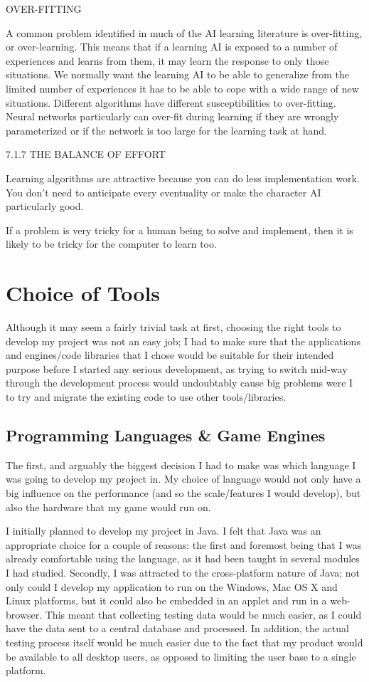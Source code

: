 \documentclass[a4paper,oneside]{report}
\begin{document}
OVER-FITTING

A common problem identified in much of the AI learning literature is over-fitting, or over-learning. This means that if a learning AI is exposed to a number of experiences and learns from them, it may learn the response to only those situations. We normally want the learning AI to be able to generalize from the limited number of experiences it has to be able to cope with a wide range of new situations.
Different algorithms have different susceptibilities to over-fitting. Neural networks particularly can over-fit during learning if they are wrongly parameterized or if the network is too large for the learning task at hand.

7.1.7 THE BALANCE OF EFFORT

Learning algorithms are attractive because you can do less implementation work. You don’t need to anticipate every eventuality or make the character AI particularly good.

If a problem is very tricky for a human being to solve and implement, then it is likely to be tricky for the computer to learn too.
	
\chapter{Choice of Tools}

Although it may seem a fairly trivial task at first, choosing the right tools to develop my project was not an easy job; I had to make sure that the applications and engines/code libraries that I chose would be suitable for their intended purpose before I started any serious development, as trying to switch mid-way through the development process would undoubtably cause big problems were I to try and migrate the existing code to use other tools/libraries.

\section{Programming Languages \& Game Engines}

The first, and arguably the biggest decision I had to make was which language I was going to develop my project in. My choice of language would not only have a big influence on the performance (and so the scale/features I would develop), but also the hardware that my game would run on.  

I initially planned to develop my project in Java. I felt that Java was an appropriate choice for a couple of reasons: the first and foremost being that I was already comfortable using the language, as it had been taught in several modules I had studied. Secondly, I was attracted to the cross-platform nature of Java; not only could I develop my application to run on the Windows, Mac OS X and Linux platforms, but it could also be embedded in an applet and run in a web-browser. This meant that collecting testing data would be much easier, as I could have the data sent to a central database and processed. In addition, the actual testing process itself would be much easier due to the fact that my product would be available to all desktop users, as opposed to limiting the user base to a single platform.
\end{document}

